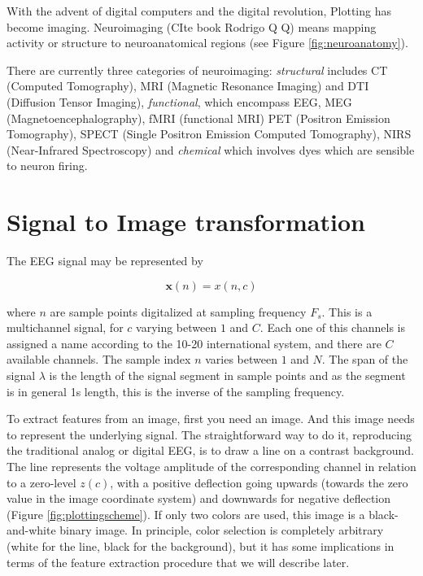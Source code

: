 \begin{story}[Neuroimaging]
With the advent of digital computers and the digital revolution, Plotting has become imaging.  Neuroimaging (CIte book Rodrigo Q Q) means mapping activity or structure to neuroanatomical regions (see Figure \ref{fig:neuroanatomy}).

There are currently three categories of neuroimaging: \textit{structural} includes CT (Computed Tomography), MRI (Magnetic Resonance Imaging) and DTI (Diffusion Tensor Imaging), \textit{functional}, which encompass EEG, MEG (Magnetoencephalography), fMRI (functional MRI) PET (Positron Emission Tomography), SPECT (Single Positron Emission Computed Tomography), NIRS (Near-Infrared Spectroscopy) and \textit{chemical} which involves dyes which are sensible to neuron firing.
\end{story}

\section{Signal to Image transformation}

The EEG signal may be represented by

\begin{equation}
\mathbf{x}(n) = x(n,c)
\label{eq:zerolevel}
\end{equation}

\noindent where $n$ are sample points digitalized at sampling frequency $F_s$.  This is a multichannel signal, for $c$ varying between $1$ and $C$.  Each one of this channels is assigned a name according to the 10-20 international system, and there are $C$ available channels. The sample index $n$ varies between $1$ and $N$.  The span of the signal $\lambda$ is the length of the signal segment in sample points and as the segment is in general 1s length, this is the inverse of the sampling frequency.

\vspace{3pt}


To extract features from an image, first you need an image.  And this image needs to represent the underlying signal.  The straightforward way to do it, reproducing the traditional analog or digital EEG, is to draw a line on a contrast background.  The line represents the voltage amplitude of the corresponding channel in relation to a zero-level $z(c)$, with a positive deflection going upwards (towards the zero value in the image coordinate system) and downwards for negative deflection (Figure \ref{fig:plottingscheme}).  If only two colors are used, this image is a black-and-white binary image.  In principle, color selection is completely arbitrary (white for the line, black for the background), but it has some implications in terms of the feature extraction procedure that we will describe later.

